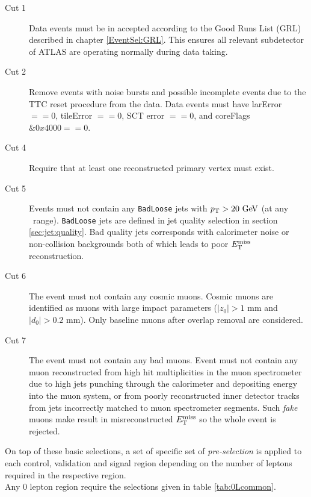 \begin{description}
\item[Cut 1] Data events must be in accepted according to the Good Runs List (GRL) described in chapter \ref{EventSel:GRL}.  This ensures all relevant subdetector of ATLAS are operating normally during data taking. 
\item[Cut 2] Remove events with noise bursts and possible incomplete events due to the TTC reset procedure from the data. Data events must have larError $== 0$, tileError $== 0$, SCT error $==0$, and coreFlags $\&0x4000 == 0$.
\item[Cut 4] Require that at least one reconstructed primary vertex must exist.
\item[Cut 5] Events must not contain any {\tt BadLoose} jets with $\pT > 20 \gev$ (at any \eta\ range). {\tt BadLoose} jets are defined in jet quality selection in section \ref{sec:jet:quality}.  Bad quality jets corresponds with calorimeter noise or non-collision backgrounds both of which leads to poor $E_{\mathrm{T}}^{\mathrm{miss}}$ reconstruction.
\item[Cut 6] The event must not contain any cosmic muons.  Cosmic muons are identified as muons with large impact parameters  ($|z_0| > 1$ mm and $|d_0| > 0.2$ mm).  Only baseline muons after overlap removal are considered.
\item[Cut 7] The event must not contain any bad muons.  Event must not contain any muon reconstructed from high hit multiplicities in the muon spectrometer due to high jets punching through the calorimeter and depositing energy into the muon system, or from poorly reconstructed inner detector tracks from jets incorrectly matched to muon spectrometer segments. Such {\it fake} muons make result in misreconstructed $E_{\mathrm{T}}^{\mathrm{miss}}$ so the whole event is rejected.
\end{description}

\indent On top of these basic selections, a set of specific set of {\it pre-selection} is applied to each control, validation and signal region depending on the number of leptons required in the respective region.  \\

\indent Any 0 lepton region require the selections given in table \ref{tab:0Lcommon}. \\

